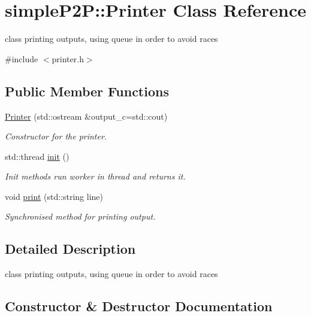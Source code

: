 \hypertarget{classsimpleP2P_1_1Printer}{}\section{simple\+P2P\+:\+:Printer Class Reference}
\label{classsimpleP2P_1_1Printer}


class printing outputs, using queue in order to avoid races  




{\ttfamily \#include $<$printer.\+h$>$}

\subsection*{Public Member Functions}
\begin{DoxyCompactItemize}
\item 
\hyperlink{classsimpleP2P_1_1Printer_ac18a99f5eab2c8c0b077063e5ed04916}{Printer} (std\+::ostream \&output\+\_\+c=std\+::cout)
\begin{DoxyCompactList}\small\item\em Constructor for the printer. \end{DoxyCompactList}\item 
std\+::thread \hyperlink{classsimpleP2P_1_1Printer_a9291e626c231334f26c305ab51e6cf19}{init} ()
\begin{DoxyCompactList}\small\item\em Init methods run worker in thread and returns it. \end{DoxyCompactList}\item 
void \hyperlink{classsimpleP2P_1_1Printer_a296b8acb2cf397eaab98087efd8959db}{print} (std\+::string line)
\begin{DoxyCompactList}\small\item\em Synchronised method for printing output. \end{DoxyCompactList}\end{DoxyCompactItemize}


\subsection{Detailed Description}
class printing outputs, using queue in order to avoid races 

\subsection{Constructor \& Destructor Documentation}
\mbox{\label{classsimpleP2P_1_1Printer_ac18a99f5eab2c8c0b077063e5ed04916}} 
